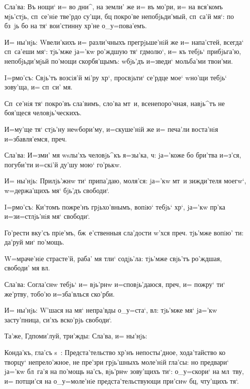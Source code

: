 Сла'ва: Въ нощи` и= во дни^, на земли' же и= въ мо'ри, 
и= на вся'комъ мjь'стjь, сп~се'нiе тве'рдо су'щи, бц 
покро'ве непобjьди'мый, сп~са'й мя`: по бз~jь бо на тя` 
вои'стинну хр'не о_у=пова'емъ.

И= ны'нjь: W\т вели'кихъ и= разли'чныхъ прегрjьше'нiй 
же и= напа'стей, всегда` сп~са'еши мя`: тjь'мже jа='кw 
ро'ждшую тя` гд молю`, и= къ тебjь` прибjьга'ю, 
непобjьди'мjьй по'мощи скорбя'щымъ: w\т бjь'дъ и=зведи` 
мольба'ми твои'ми.


I=рмо'съ: Свjь'тъ возсiя'й мi'ру хр`, просвjьти` 
се'рдце мое` w\т но'щи тебjь` зову'ща, и= сп~си' мя.

Сп~се'нiя тя` покро'въ сла'вимъ, сло'ва мт~и, 
всенепоро'чная, навjь^тъ не боя'щеся человjь'ческихъ.

И=му'ще тя` стjь'ну неwбори'му, и=скуше'нiй же и= 
печа'ли воста'нiя и=збавля'емся, преч.

Сла'ва: И=зми' мя w\т sлы'хъ человjь^къ я=зы'ка, 
ч: jа='коже бо бри'тва и=з'ся, погуби'ти 
и=скi'й ду'шу мою` го'рькw. 

И= ны'нjь: Прилjь'жнw ти` припа'даю, моля'ся: jа='кw 
мт~и зижди'теля моегw`, w=держа'щихъ мя` бjь'дъ свободи`.


I=рмо'съ: Ки'томъ пожре'нъ грjьхо'внымъ, вопiю` тебjь` 
хр`, jа='кw пр'ка и=з\ъ и=стлjь'нiя мя` свободи`.

Го'рести вку'съ прiе'мъ, бж~е'ственныя сла'дости 
w'хся преч. тjь'мже вопiю' ти: да'руй ми` 
по'мощь.

W=мраче'нiе страсте'й, раба' мя тли` содjь'ла: тjь'мже 
свjь'тъ ро'ждшая, свободи' мя вл.

Сла'ва: Согла'снw тебjь` и= вjь'рнw и=сповjь'даюся, 
преч, и= пожру` ти` же'ртву, тобо'ю и=зба'влься 
ско'рби.

И= ны'нjь: W'шася на мя` непра'вды о_у=ста`, 
вл: тjь'мже мя` jа='кw засту'пница, си'хъ вско'рjь 
свободи`. 

Та'же, Гд поми'луй, три'жды: Сла'ва, и= ны'нjь:

Конда'къ, гла'съ s~: Предста'тельство хр'нъ 
непосты'дное, хода'тайство ко творцу` непрело'жное, не 
пре'зри грjь'шныхъ моле'нiй гла'сы: но предвари` jа='кw 
бл~га'я на по'мощь на'съ, вjь'рнw зову'щихъ ти`: 
о_у=скори` на мл~тву, и= потщи'ся на о_у=моле'нiе 
предста'тельствующи при'снw бц, чту'щихъ тя`.

